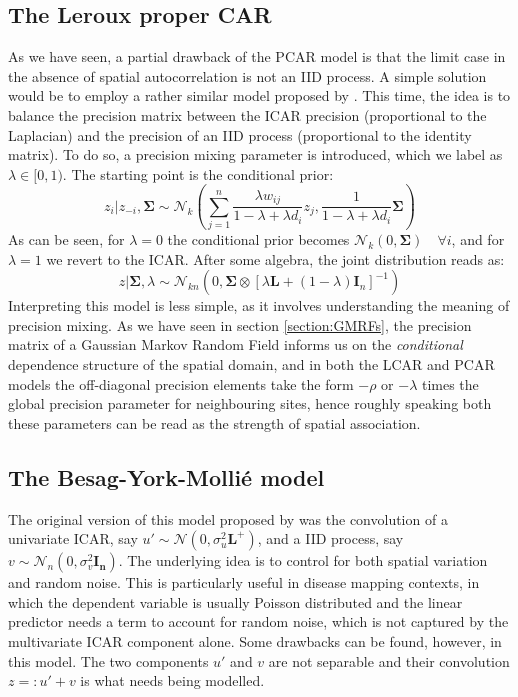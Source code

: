 \documentclass[openany, 11pt, oneside]{book}
\begin{document}
\subsection{The Leroux proper CAR} \label{subsection:lcar}

As we have seen, a partial drawback of the PCAR model is that the limit case in the absence of spatial autocorrelation is not an IID process. A simple solution would be to employ a rather similar model proposed by \cite{Leroux}. This time, the idea is to balance the precision matrix between the ICAR precision (proportional to the Laplacian) and the precision of an IID process (proportional to the identity matrix). To do so, a precision mixing parameter is introduced, which we label as $\lambda \in [0,1)$. The starting point is the conditional prior:
%
$$
z_i \vert z_{-i}, \boldsymbol{\Sigma} \sim \mathcal{N}_{k} \left(\sum_{j=1}^{n} \frac{ \lambda w_{ij}}{1 - \lambda  + \lambda d_i} z_{j}, \frac{1}{1 - \lambda + \lambda d_i} \boldsymbol{\Sigma}\right)
$$
%
As can be seen, for $\lambda = 0$ the conditional prior becomes $\mathcal{N}_k(0, \boldsymbol{\Sigma}) \quad \forall i$, and for $\lambda = 1$ we revert to the ICAR. After some algebra, the joint distribution reads as:
%
\begin{equation}
z\vert\boldsymbol{\Sigma}, \lambda \sim \mathcal{N}_{kn} \left( 0,   \boldsymbol{\Sigma}
  \otimes [\lambda \boldsymbol{L} + (1-\lambda)\boldsymbol{I}_{n} ]^{-1}\right)
 \label{eq:lcar}
\end{equation}
%
Interpreting this model is less simple, as it involves understanding the meaning of precision mixing. As we have seen in section \ref{section:GMRFs}, the precision matrix of a Gaussian Markov Random Field informs us on the \textit{conditional} dependence structure of the spatial domain, and in both the LCAR and PCAR models the off-diagonal precision elements take the form $-\rho$ or $-\lambda$ times the global precision parameter for neighbouring sites, hence roughly speaking both these parameters can be read as the strength of spatial association. 

\subsection{The Besag-York-Mollié model} \label{subsection:bym}

The original version of this model proposed by \cite{BYM} was the convolution of a univariate ICAR, say $u' \sim \mathcal{N}(0, \sigma_u^2 \boldsymbol{L}^+)$, and a IID process, say $v \sim \mathcal{N}_n(0, \sigma_v^2 \boldsymbol{I_n})$. The underlying idea is to control for both spatial variation and random noise. This is particularly useful in disease mapping contexts, in which the dependent variable is usually Poisson distributed and the linear predictor needs a term to account for random noise, which is not captured by the multivariate ICAR component alone. Some drawbacks can be found, however, in this model. The two components $u'$ and $v$ are not separable and their convolution $z =: u' + v$ is what needs being modelled.
\end{document}
